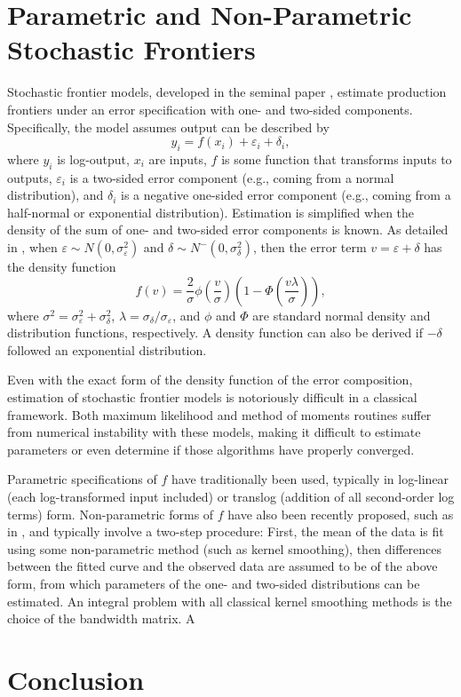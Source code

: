 \documentclass[twocolumn]{article}
\newcommand{\ep}{\varepsilon}
\begin{document}
\section{Parametric and Non-Parametric Stochastic Frontiers}

Stochastic frontier models, developed in the seminal paper \cite{AignerLovellSchmidt}, estimate production frontiers under an error specification with one- and two-sided components. Specifically, the model assumes output can be described by
\begin{equation}
	y_i = f(x_i) + \ep_i + \delta_i,
\end{equation}
where $y_i$ is log-output, $x_i$ are inputs, $f$ is some function that transforms inputs to outputs, $\ep_i$ is a two-sided error component (e.g., coming from a normal distribution), and $\delta_i$ is a negative one-sided error component (e.g., coming from a half-normal or exponential distribution). Estimation is simplified when the density of the sum of one- and two-sided error components is known. As detailed in \cite{AignerLovellSchmidt}, when $\ep\sim N(0, \sigma_\ep^2)$ and $\delta\sim N^-(0, \sigma_\delta^2)$, then the error term $v = \ep + \delta$ has the density function
\begin{equation}
	f(v) = \frac2\sigma \phi\left(\frac{v}\sigma\right)\left(1 - \Phi\left(\frac{v\lambda}{\sigma}\right)\right),
\end{equation}
where $\sigma^2 = \sigma_\ep^2 + \sigma_\delta^2$, $\lambda = \sigma_\delta / \sigma_\ep$, and $\phi$ and $\Phi$ are standard normal density and distribution functions, respectively. A density function can also be derived if $-\delta$ followed an exponential distribution.

Even with the exact form of the density function of the error composition, estimation of stochastic frontier models is notoriously difficult in a classical framework. Both maximum likelihood and method of moments routines suffer from numerical instability with these models, making it difficult to estimate parameters or even determine if those algorithms have properly converged. 

Parametric specifications of $f$ have traditionally been used, typically in log-linear (each log-transformed input included) or translog (addition of all second-order log terms) form. Non-parametric forms of $f$ have also been recently proposed, such as in \cite{ParmeterRacine}, and typically involve a two-step procedure: First, the mean of the data is fit using some non-parametric method (such as kernel smoothing), then differences between the fitted curve and the observed data are assumed to be of the above form, from which parameters of the one- and two-sided distributions can be estimated. An integral problem with all classical kernel smoothing methods is the choice of the bandwidth matrix. A 

\section{Conclusion}



\end{document}
